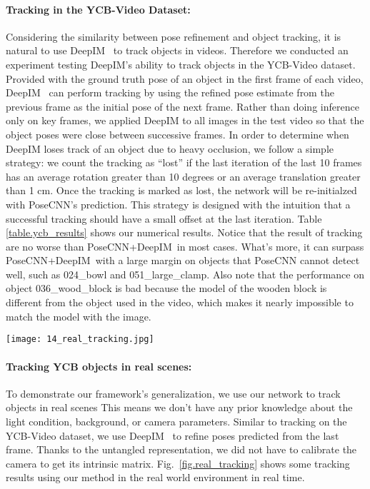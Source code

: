 \documentclass[twocolumn]{svjour3}
\newcommand{\dimnet}[0]{DeepIM}
\begin{document}
\paragraph{Tracking in the YCB-Video Dataset:} Considering the similarity between pose refinement and object tracking, it is natural to use \dimnet~ to track objects in videos. Therefore we conducted an experiment testing \dimnet 's ability to track objects in the YCB-Video dataset. Provided with the ground truth pose of an object in the first frame of each video, \dimnet~ can perform tracking by using the refined pose estimate from the previous frame as the initial pose of the next frame. Rather than doing inference only on key frames, we applied DeepIM to all images in the test video so that the object poses were close between successive frames. 
In order to determine when DeepIM loses track of an object due to heavy occlusion, we follow a simple strategy: we count the tracking as ``lost'' if the last iteration of the last 10 frames has an average rotation greater than 10 degrees or an average translation greater than 1 cm. Once the tracking is marked as lost, the network will be re-initialzed with PoseCNN's prediction. This strategy is designed with the intuition that a successful tracking should have a small offset at the last iteration. Table \ref{table.ycb_results} shows our numerical results. Notice that the result of tracking are no worse than PoseCNN+\dimnet~in most cases. What's more, it can surpass PoseCNN+\dimnet~with a large margin on objects that PoseCNN cannot detect well, such as 024\_bowl and 051\_large\_clamp. Also note that the performance on object 036\_wood\_block is bad because the model of the wooden block is different from the object used in the video, which makes it nearly impossible to match the model with the image. 
\begin{figure*}[t]
	\centering
	\texttt{[image: 14\_real\_tracking.jpg]}
\caption{Examples on tracking in the real world, using the same network as in Table.~\ref{table.ycb_results} and no prior knowledge about focal length.  The first row shows the images captured with a webcam and the second row renders the object onto the image based on the estimated pose.}
\label{fig.real_tracking}
\end{figure*}
\paragraph{Tracking YCB objects in real scenes:} To demonstrate our framework's generalization, we use our network to track objects in real scenes This means we don't have any prior knowledge about the light condition, background, or camera parameters. Similar to tracking on the YCB-Video dataset, we use \dimnet~ to refine poses predicted from the last frame. Thanks to the untangled representation, we did not have to calibrate the camera to get its intrinsic matrix. Fig.~\ref{fig.real_tracking} shows some tracking results using our method in the real world environment in real time. 
\end{document}
